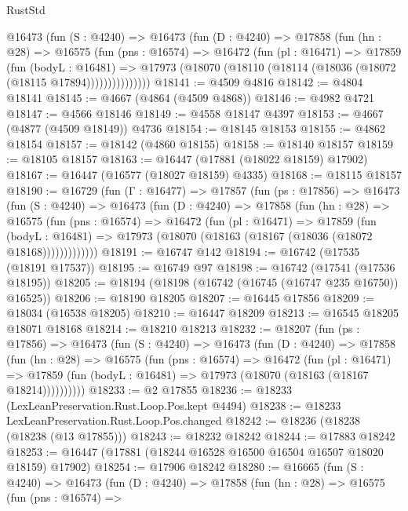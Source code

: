 \begin{lexlean}{RustStd}
\begin{coremodule}
        @16473
          (fun (S : @4240) =>
          @16473
            (fun (D : @4240) =>
            @17858
              (fun (hn : @28) =>
              @16575
                (fun (pns : @16574) =>
                @16472
                  (fun (pl : @16471) =>
                  @17859
                    (fun (bodyL : @16481) =>
                    @17973 (@18070 (@18110 (@18114 (@18036 (@18072 (@18115 @17894)))))))))))))))
@18141 := @4509 @4816
@18142 := @4804 @18141
@18145 := @4667 (@4864 (@4509 @4868))
@18146 := @4982 @4721
@18147 := @4566 @18146
@18149 := @4558 @18147 @4397
@18153 := @4667 (@4877 (@4509 @18149)) @4736
@18154 := @18145 @18153
@18155 := @4862 @18154
@18157 := @18142 (@4860 @18155)
@18158 := @18140 @18157
@18159 := @18105 @18157
@18163 := @16447 (@17881 (@18022 @18159) @17902)
@18167 := @16447 (@16577 (@18027 @18159) @4335)
@18168 := @18115 @18157
@18190 := @16729
    (fun (Γ : @16477) =>
    @17857
      (fun (ps : @17856) =>
      @16473
        (fun (S : @4240) =>
        @16473
          (fun (D : @4240) =>
          @17858
            (fun (hn : @28) =>
            @16575
              (fun (pns : @16574) =>
              @16472
                (fun (pl : @16471) =>
                @17859
                  (fun (bodyL : @16481) =>
                  @17973 (@18070 (@18163 (@18167 (@18036 (@18072 @18168)))))))))))))
@18191 := @16747 @142
@18194 := @16742 (@17535 (@18191 @17537))
@18195 := @16749 @97
@18198 := @16742 (@17541 (@17536 @18195))
@18205 := @18194 (@18198 (@16742 (@16745 (@16747 @235 @16750)) @16525))
@18206 := @18190 @18205
@18207 := @16445 @17856
@18209 := @18034 (@16538 @18205)
@18210 := @16447 @18209
@18213 := @16545 @18205 @18071 @18168
@18214 := @18210 @18213
@18232 := @18207
    (fun (ps : @17856) =>
    @16473
      (fun (S : @4240) =>
      @16473
        (fun (D : @4240) =>
        @17858
          (fun (hn : @28) =>
          @16575
            (fun (pns : @16574) =>
            @16472
              (fun (pl : @16471) =>
              @17859 (fun (bodyL : @16481) => @17973 (@18070 (@18163 (@18167 @18214))))))))))
@18233 := @2 @17855
@18236 := @18233 (LexLeanPreservation.Rust.Loop.Pos.kept @4494)
@18238 := @18233 LexLeanPreservation.Rust.Loop.Pos.changed
@18242 := @18236 (@18238 (@18238 (@13 @17855)))
@18243 := @18232 @18242
@18244 := @17883 @18242
@18253 := @16447 (@17881 (@18244 @16528 @16500 @16504 @16507 @18020 @18159) @17902)
@18254 := @17906 @18242
@18280 := @16665
    (fun (S : @4240) =>
    @16473
      (fun (D : @4240) =>
      @17858
        (fun (hn : @28) =>
        @16575
          (fun (pns : @16574) =>

\end{coremodule}
\end{lexlean}
